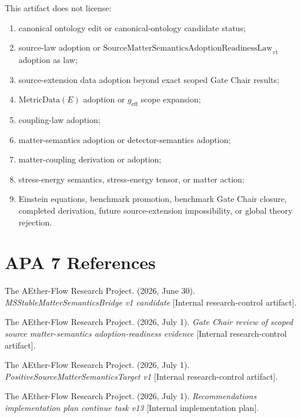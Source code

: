 \documentclass[11pt]{article}
\newcommand{\SMSAR}{\mathrm{SourceMatterSemanticsAdoptionReadinessLaw}_{v1}}
\newcommand{\MetricData}{\mathrm{MetricData}}
\newcommand{\geff}{g_{\mathrm{eff}}}
\begin{document}
This artifact does not license:
\begin{enumerate}[leftmargin=*]
  \item canonical ontology edit or canonical-ontology candidate status;
  \item source-law adoption or \(\SMSAR\) adoption as law;
  \item source-extension data adoption beyond exact scoped Gate Chair results;
  \item \(\MetricData(E)\) adoption or \(\geff\) scope expansion;
  \item coupling-law adoption;
  \item matter-semantics adoption or detector-semantics adoption;
  \item matter-coupling derivation or adoption;
  \item stress-energy semantics, stress-energy tensor, or matter action;
  \item Einstein equations, benchmark promotion, benchmark Gate Chair closure,
  completed derivation, future source-extension impossibility, or global
  theory rejection.
\end{enumerate}

\section{APA 7 References}

The AEther-Flow Research Project. (2026, June 30). \textit{MSStableMatterSemanticsBridge
v1 candidate} [Internal research-control artifact].

The AEther-Flow Research Project. (2026, July 1). \textit{Gate Chair review of
scoped source matter-semantics adoption-readiness evidence} [Internal
research-control artifact].

The AEther-Flow Research Project. (2026, July 1). \textit{PositiveSourceMatterSemanticsTarget
v1} [Internal research-control artifact].

The AEther-Flow Research Project. (2026, July 1). \textit{Recommendations
implementation plan continue task v13} [Internal implementation plan].
\end{document}
